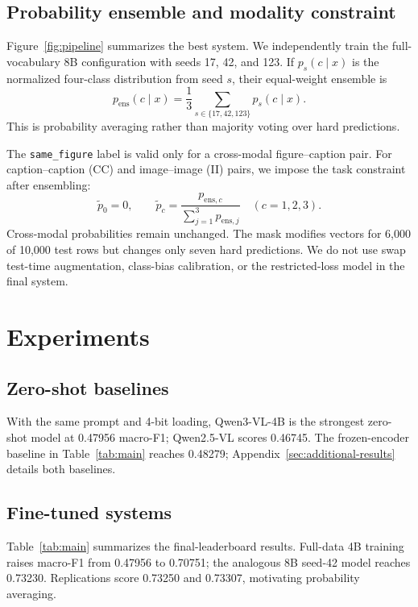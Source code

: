 \documentclass[11pt]{article}
\newcommand{\sfclass}{\texttt{same\_figure}}
\begin{document}
\subsection{Probability ensemble and modality constraint}

Figure~\ref{fig:pipeline} summarizes the best system.  We independently train the full-vocabulary 8B configuration with seeds 17, 42, and 123.  If $p_s(c\mid x)$ is the normalized four-class distribution from seed $s$, their equal-weight ensemble is
\begin{equation}
p_{\mathrm{ens}}(c\mid x)=\frac{1}{3}
\sum_{s\in\{17,42,123\}}p_s(c\mid x).
\end{equation}
This is probability averaging rather than majority voting over hard predictions.

The \sfclass{} label is valid only for a cross-modal figure--caption pair.  For caption--caption (CC) and image--image (II) pairs, we impose the task constraint after ensembling:
\begin{equation}
\widetilde p_0=0,\qquad
\widetilde p_c=\frac{p_{\mathrm{ens},c}}{\sum_{j=1}^{3}p_{\mathrm{ens},j}}
\quad(c=1,2,3).
\end{equation}
Cross-modal probabilities remain unchanged.  The mask modifies vectors for 6,000 of 10,000 test rows but changes only seven hard predictions.  We do not use swap test-time augmentation, class-bias calibration, or the restricted-loss model in the final system.

\section{Experiments}

\subsection{Zero-shot baselines}

With the same prompt and 4-bit loading, Qwen3-VL-4B is the strongest zero-shot model at 0.47956 macro-F1; Qwen2.5-VL \citep{bai2025qwen25vl} scores 0.46745.  The frozen-encoder baseline in Table~\ref{tab:main} reaches 0.48279; Appendix~\ref{sec:additional-results} details both baselines.

\subsection{Fine-tuned systems}

Table~\ref{tab:main} summarizes the final-leaderboard results.  Full-data 4B training raises macro-F1 from 0.47956 to 0.70751; the analogous 8B seed-42 model reaches 0.73230.  Replications score 0.73250 and 0.73307, motivating probability averaging.
\end{document}
